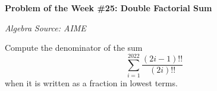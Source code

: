 \begin{potw}\vspace{5pt}
{\large\textbf{Problem of the Week \#25: Double Factorial Sum}}\vspace{5pt}

\textit{Algebra}\newline
\textit{Source: AIME}\V

Compute the denominator of the sum
\[\sum_{i=1}^{2022} \frac{(2i-1)!!}{(2i)!!}\]
when it is written as a fraction in lowest terms.
\end{potw}\V
